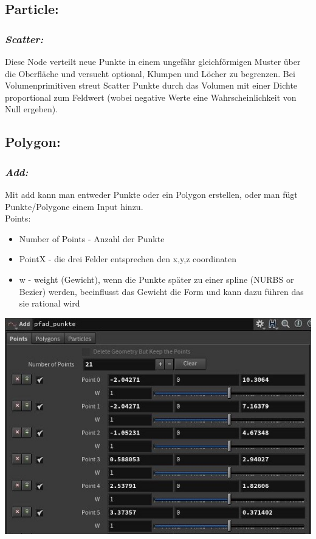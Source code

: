 \documentclass[paper=a4,fontsize=12pt,ngerman]{scrartcl}
\begin{document}
	\subsection*{Particle:}
	\subsubsection*{\textit{Scatter:}}
	Diese Node verteilt neue Punkte in einem ungefähr gleichförmigen Muster über die Oberfläche und versucht optional, Klumpen und Löcher zu begrenzen. Bei Volumenprimitiven streut Scatter Punkte durch das Volumen mit einer Dichte proportional zum Feldwert (wobei negative Werte eine Wahrscheinlichkeit von Null ergeben).
	
	\subsection*{Polygon:}
	\subsubsection*{\textit{Add:}}
	Mit add kann man entweder Punkte oder ein Polygon erstellen, oder man fügt Punkte/Polygone einem Input hinzu.\\
	Points:
	\begin{itemize}
		\item Number of Points - Anzahl der Punkte
		\item PointX - die drei Felder entsprechen den x,y,z coordinaten
		\item w - weight (Gewicht), wenn die Punkte später zu einer spline (NURBS or Bezier) werden, beeinflusst das Gewicht die Form und kann dazu führen das sie rational wird
	\end{itemize}
	\includegraphics*[width=\textwidth]{graphics/add.JPG}
\end{document}
